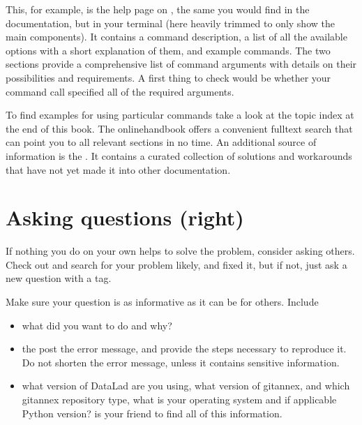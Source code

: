 \sphinxAtStartPar
This, for example, is the help page on , the same you would find in the documentation, but in your terminal (here heavily trimmed to only show the main components).
It contains a command description, a list
of all the available options with a short explanation of them, and
example commands. The two  sections provide a comprehensive
list of command arguments with details on their possibilities and
requirements. A first thing to check would be whether your command call
specified all of the required arguments.

\sphinxAtStartPar
To find examples for using particular commands take a look at the topic index at the end of this book.
The online\sphinxhyphen{}handbook offers a convenient full\sphinxhyphen{}text search that can point you to all relevant sections in no time.
An additional source of information is the . It contains a curated
collection of solutions and workarounds that have not yet made it into other
documentation.


\section{Asking questions (right)}
\label{\detokenize{basics/101-135-help:asking-questions-right}}
\sphinxAtStartPar
If nothing you do on your own helps to solve the problem,
consider asking others. Check out 
and search for your problem \textendash{} likely,
and fixed it, but if not, just ask a new question with a  tag.

\sphinxAtStartPar
Make sure your question is as informative as it can be for others.
Include
\begin{itemize}
\item {} 
\sphinxAtStartPar
{} \textendash{} what did you want to do and why?

\item {} 
\sphinxAtStartPar
the  \textendash{} post the error message, and provide the
steps necessary to reproduce it. Do not shorten the error message, unless it contains sensitive information.

\item {} 
\sphinxAtStartPar
{} \textendash{} what version of DataLad are you using, what version
of git\sphinxhyphen{}annex, and which git\sphinxhyphen{}annex repository type, what is your operating
system and \textendash{} if applicable \textendash{} Python version?  is your friend
to find all of this information.

\end{itemize}

